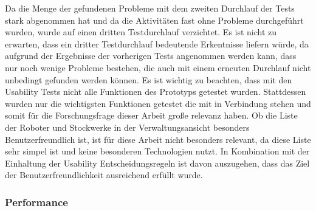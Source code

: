 Da die Menge der gefundenen Probleme mit dem zweiten Durchlauf der Tests stark abgenommen hat und da die Aktivitäten fast ohne Probleme durchgeführt wurden, wurde auf einen dritten Testdurchlauf verzichtet. Es ist nicht zu erwarten, dass ein dritter Testdurchlauf bedeutende Erkentnisse liefern würde, da aufgrund der Ergebnisse der vorherigen Tests angenommen werden kann, dass nur noch wenige Probleme bestehen, die auch mit einem erneuten Durchlauf nicht unbedingt gefunden werden können. Es ist wichtig zu beachten, dass mit den Usability Tests nicht alle Funktionen des Prototyps getestet wurden. Stattdessen wurden nur die wichtigsten Funktionen getestet die mit \deckgl{} in Verbindung stehen und somit für die Forschungsfrage dieser Arbeit große relevanz haben. Ob die Liste der Roboter und Stockwerke in der Verwaltungsansicht besonders Benutzerfreundlich ist, ist für diese Arbeit nicht besonders relevant, da diese Liste sehr simpel ist und keine besonderen Technologien nutzt. In Kombination mit der Einhaltung der Usability Entscheidungsregeln ist davon auszugehen, dass das Ziel der Benutzerfreundlichkeit ausreichend erfüllt wurde.

\subsubsection{Performance}



